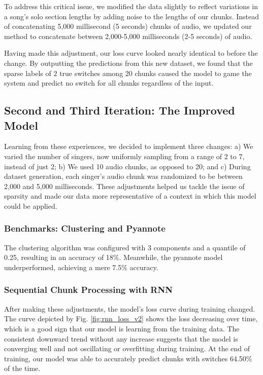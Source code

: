 \documentclass[conference]{IEEEtran}
\begin{document}
    To address this critical issue, we modified the data slightly to reflect variations in a song's solo section lengths by adding noise to the lengths of our chunks. Instead of concatenating 5,000 millisecond (5 seconds) chunks of audio, we updated our method to concatenate between 2,000-5,000 milliseconds (2-5 seconds) of audio.

    Having made this adjustment, our loss curve looked nearly identical to before the change. By outputting the predictions from this new dataset, we found that the sparse labels of $2$ true switches among $20$ chunks caused the model to game the system and predict no switch for all chunks regardless of the input. \\

    \subsection{Second and Third Iteration: The Improved Model}
    Learning from these experiences, we decided to implement three changes: a) We varied the number of singers, now uniformly sampling from a range of 2 to 7, instead of just 2; b) We used 10 audio chunks, as opposed to 20; and c) During dataset generation, each singer's audio chunk was randomized to be between 2,000 and 5,000 milliseconds. These adjustments helped us tackle the issue of sparsity and made our data more representative of a context in which this model could be applied.


    \subsubsection{Benchmarks: Clustering and Pyannote}
    The clustering algorithm was configured with 3 components and a quantile of 0.25, resulting in an accuracy of 18\%. Meanwhile, the pyannote model underperformed, achieving a mere 7.5\% accuracy. 

    \subsubsection{Sequential Chunk Processing with RNN}
    After making these adjustments, the model's loss curve during training changed. The curve depicted by Fig. \ref{fig:rnn_loss_v2} shows the loss decreasing over time, which is a good sign that our model is learning from the training data. The consistent downward trend without any increase suggests that the model is converging well and not oscillating or overfitting during training. At the end of training, our model was able to accurately predict chunks with switches 64.50\% of the time. 
    
\end{document}
